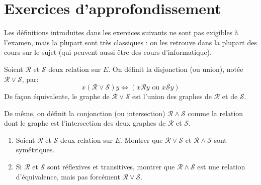 \section{Exercices d'approfondissement}


Les définitions introduites dans les exercices suivants ne sont pas exigibles à l'examen, mais la plupart sont très classiques : on les retrouve dans la plupart des cours sur le sujet (qui peuvent aussi être des cours d'informatique).

\begin{exercice}\label{exo-union-intersection-relations}
Soient $\mathcal R$ et $\mathcal S$ deux relation sur $E$. On définit la disjonction (ou union), notée $\mathcal R \vee \mathcal S$, par:
\[ x (\mathcal R \vee \mathcal S) y \iff (x \mathcal R y\text{ ou } x \mathcal S y)\]
De façon équivalente, le graphe de $\mathcal R \vee \mathcal S$ est l'union des graphes de $\mathcal R$ et de $\mathcal S$.

De même, on définit la conjonction (ou intersection) $\mathcal R \wedge \mathcal S$ comme la relation dont le graphe est l'intersection des deux graphes de $\mathcal R$ et $\mathcal S$.


\begin{enumerate}
\item Soient $\mathcal R$ et $\mathcal S$ deux relation sur $E$. Montrer que $\mathcal R \vee \mathcal S$ et $\mathcal R \wedge \mathcal S$ sont symétriques.
\item Si $\mathcal R$ et $\mathcal S$ sont réflexives et transitives, montrer que $\mathcal R \wedge \mathcal S$ est une relation d'équivalence, mais pas forcément $\mathcal R \vee \mathcal S$.
\end{enumerate}
\end{exercice}



